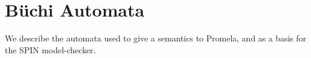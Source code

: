 \section{B\"{u}chi Automata}

We describe the automata used to give a semantics to Promela,
and as a basis for the SPIN model-checker.
